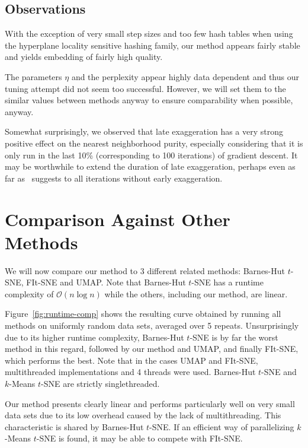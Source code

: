 \subsection{Observations}

With the exception of very small step sizes and too few hash tables when using
the hyperplane locality sensitive hashing family, our method appears fairly
stable and yields embedding of fairly high quality.

The parameters $\eta$ and the perplexity appear highly data dependent and thus our
tuning attempt did not seem too successful. However, we will set them to the similar
values between methods anyway to ensure comparability when possible, anyway.

Somewhat surprisingly, we observed that late exaggeration has a very strong
positive effect on the nearest neighborhood purity, especially considering that
it is only run in the last 10\% (corresponding to 100 iterations) of gradient
descent. It may be worthwhile to extend the duration of late exaggeration,
perhaps even as far as~\cite{arttsne} suggests to all iterations without early
exaggeration.

\section{Comparison Against Other Methods}

We will now compare our method to 3 different related methods: Barnes-Hut $t$-SNE,
FIt-SNE and UMAP. Note that Barnes-Hut $t$-SNE has a runtime complexity of $\mathcal{O}(n \log n)$
while the others, including our method, are linear.

Figure~\ref{fig:runtime-comp} shows the resulting curve obtained by running all
methods on uniformly random data sets, averaged over 5 repeats. Unsurprisingly
due to its higher runtime complexity, Barnes-Hut $t$-SNE is by far the worst method
in this regard, followed by our method and UMAP, and finally FIt-SNE, which performs
the best. Note that in the cases UMAP and FIt-SNE, multithreaded implementations and 4 threads
were used. Barnes-Hut $t$-SNE and $k$-Means $t$-SNE are strictly singlethreaded.

Our method presents clearly linear and performs particularly well on very small data sets
due to its low overhead caused by the lack of multithreading. This characteristic is shared
by Barnes-Hut $t$-SNE. If an efficient way of parallelizing $k$-Means $t$-SNE is found,
it may be able to compete with FIt-SNE.

